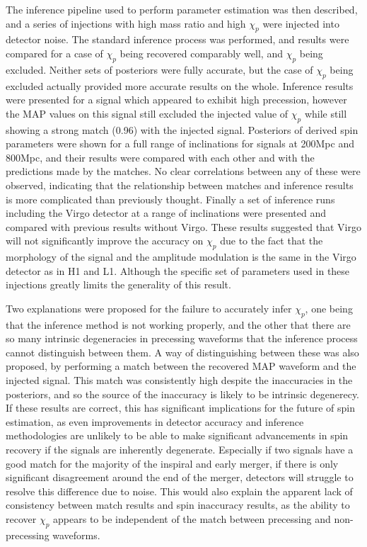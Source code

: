 \documentclass[11pt]{article}
\begin{document}
The inference pipeline used to perform parameter estimation was then described, and a series of injections with high mass ratio and high $\chi_p$ were injected into detector noise. The standard inference process was performed, and results were compared for a case of $\chi_p$ being recovered comparably well, and $\chi_p$ being excluded. Neither sets of posteriors were fully accurate, but the case of $\chi_p$ being excluded actually provided more accurate results on the whole. Inference results were presented for a signal which appeared to exhibit high precession, however the MAP values on this signal still excluded the injected value of $\chi_p$ while still showing a strong match (0.96) with the injected signal. Posteriors of derived spin parameters were shown for a full range of inclinations for signals at 200Mpc and 800Mpc, and their results were compared with each other and with the predictions made by the matches. No clear correlations between any of these were observed, indicating that the relationship between matches and inference results is more complicated than previously thought. Finally a set of inference runs including the Virgo detector at a range of inclinations were presented and compared with previous results without Virgo. These results suggested that Virgo will not significantly improve the accuracy on $\chi_p$ due to the fact that the morphology of the signal and the amplitude modulation is the same in the Virgo detector as in H1 and L1. Although the specific set of parameters used in these injections greatly limits the generality of this result.


Two explanations were proposed for the failure to accurately infer $\chi_p$, one being that the inference method is not working properly, and the other that there are so many intrinsic degeneracies in precessing waveforms that the inference process cannot distinguish between them. A way of distinguishing between these was also proposed, by performing a match between the recovered MAP waveform and the injected signal. This match was consistently high despite the inaccuracies in the posteriors, and so the source of the inaccuracy is likely to be intrinsic degenerecy. If these results are correct, this has significant implications for the future of spin estimation, as even improvements in detector accuracy and inference methodologies are unlikely to be able to make significant advancements in spin recovery if the signals are inherently degenerate. Especially if two signals have a good match for the majority of the inspiral and early merger, if there is only significant disagreement around the end of the merger, detectors will struggle to resolve this difference due to noise. This would also explain the apparent lack of consistency between match results and spin inaccuracy results, as the ability to recover $\chi_p$ appears to be independent of the match between precessing and non-precessing waveforms.
\end{document}
